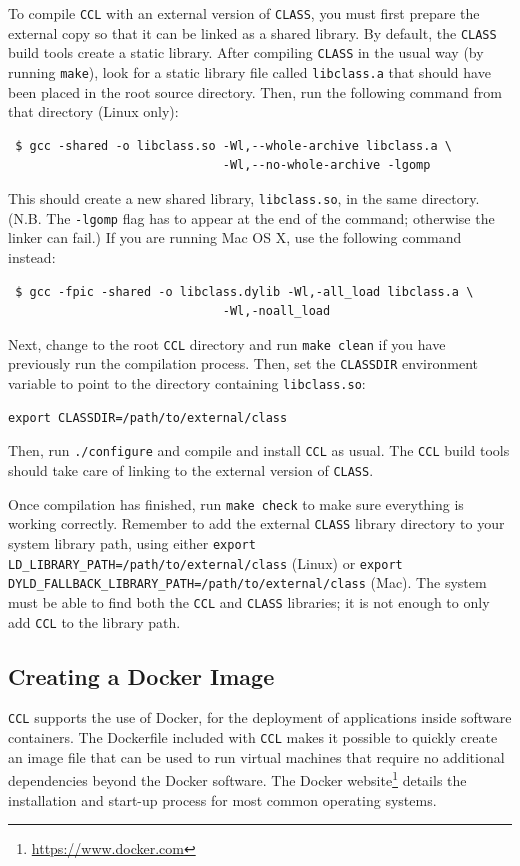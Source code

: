 \documentclass[\docopts]{\docclass}
\newcommand{\ccl}{{\tt CCL}\xspace}
\begin{document}
To compile \ccl with an external version of {\tt CLASS}, you must first prepare the external copy so that it can be linked as a shared library. By default, the {\tt CLASS} build tools create a static library. After compiling {\tt CLASS} in the usual way (by running {\tt make}), look for a static library file called {\tt libclass.a} that should have been placed in the root source directory. Then, run the following command from that directory (Linux only):
\begin{verbatim}
 $ gcc -shared -o libclass.so -Wl,--whole-archive libclass.a \
                              -Wl,--no-whole-archive -lgomp
\end{verbatim}
This should create a new shared library, {\tt libclass.so}, in the same directory. (N.B. The {\tt -lgomp} flag has to appear at the end of the command; otherwise the linker can fail.) If you are running Mac OS X, use the following command instead:
\begin{verbatim}
 $ gcc -fpic -shared -o libclass.dylib -Wl,-all_load libclass.a \
                              -Wl,-noall_load
\end{verbatim}

Next, change to the root \ccl directory and run {\tt make clean} if you have previously run the compilation process. Then, set the {\tt CLASSDIR} environment variable to point to the directory containing {\tt libclass.so}:
\begin{verbatim}
export CLASSDIR=/path/to/external/class
\end{verbatim}
Then, run {\tt ./configure} and compile and install \ccl as usual. The \ccl build tools should take care of linking to the external version of {\tt CLASS}.

Once compilation has finished, run {\tt make check} to make sure everything is working correctly. Remember to add the external {\tt CLASS} library directory to your system library path, using either {\tt export LD\_LIBRARY\_PATH=/path/to/external/class} (Linux) or {\tt export DYLD\_FALLBACK\_LIBRARY\_PATH=/path/to/external/class} (Mac). The system must be able to find both the \ccl and {\tt CLASS} libraries; it is not enough to only add \ccl to the library path.

\subsection{Creating a Docker Image}
\ccl supports the use of Docker, for the deployment of applications inside software containers. The Dockerfile included with \ccl makes it possible to quickly create an image file that can be used to run virtual machines that require no additional dependencies beyond the Docker software. The Docker website\footnote{\url{https://www.docker.com}} details the installation and start-up process for most common operating systems.
\end{document}
